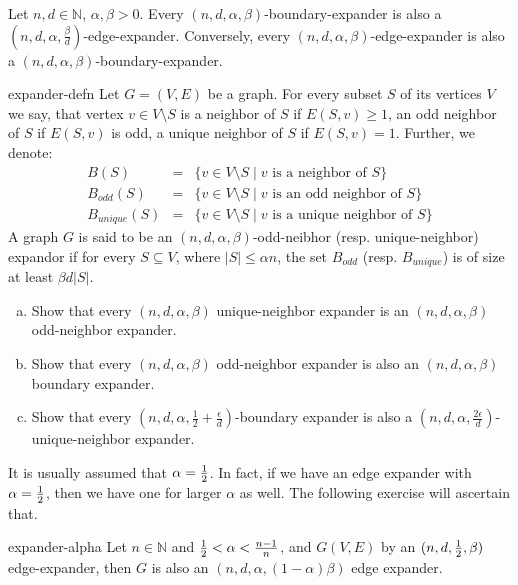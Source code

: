 \begin{exercise}
Let $n,d \in \mathbb{N}$, $\alpha, \beta > 0$.
Every $(n,d,\alpha,\beta)$-boundary-expander is also a $(n,d,\alpha,\frac{\beta}{d})$-edge-expander. Conversely, every $(n,d,\alpha,\beta)$-edge-expander is also a $(n,d,\alpha,\beta)$-boundary-expander.
\end{exercise}
\begin{exercise-prob}
\begin{show-ps3}{expander-defn}
Let $G=(V,E)$ be a graph. For every subset $S$ of its vertices $V$ we say, that vertex $v \in V\setminus S$ is a neighbor of $S$ if $E(S,{v}) \ge 1$, an odd neighbor of $S$ if $E(S,{v})$ is odd, a unique neighbor of $S$ if $E(S,{v})=1$. Further, we denote:
\begin{eqnarray*}
B(S) & = & \{v \in V \setminus S \mid v \textrm{ is a neighbor of } S\}\\
B_{odd}(S) & = & \{v \in V \setminus S  \mid v \textrm{ is an odd neighbor of } S\}\\
B_{unique}(S) & = & \{v \in V \setminus S \mid v \textrm{ is a unique neighbor of } S\}
\end{eqnarray*}
A graph $G$ is said to be an $(n,d,\alpha,\beta)$-odd-neibhor (resp. unique-neighbor) expandor if for every $S \subseteq V$, where $|S| \le \alpha n$, the set $B_{odd}$ (resp. $B_{unique}$)  is of size at least $\beta d |S|$.
\begin{enumerate}[(a)]
\item Show that every $(n,d,\alpha,\beta)$ unique-neighbor expander is an $(n,d,\alpha,\beta)$ odd-neighbor expander.
\item Show that every $(n,d,\alpha,\beta)$ odd-neighbor expander is also an $(n,d,\alpha,\beta)$ boundary expander.
\item Show that every $(n,d,\alpha,\frac{1}{2}+\frac{\epsilon}{d})$-boundary expander is also a $(n,d,\alpha,\frac{2\epsilon}{d})$-unique-neighbor expander.
\end{enumerate}
\end{show-ps3}
\end{exercise-prob}

It is usually assumed that $\alpha = \frac{1}{2}$. In fact, if we have an edge expander with $\alpha = \frac{1}{2}$, then we have one for larger $\alpha$ as well. The following exercise will ascertain that.

\begin{exercise-prob}
\begin{show-ps3}{expander-alpha}
Let $n \in \mathbb{N}$ and $\frac{1}{2} < \alpha < \frac{n-1}{n}$, and $G(V,E)$ by an $(n,d,\frac{1}{2},\beta)$ edge-expander, then $G$ is also an $(n,d,\alpha,(1-\alpha)\beta)$ edge expander.
\end{show-ps3}
\end{exercise-prob}

